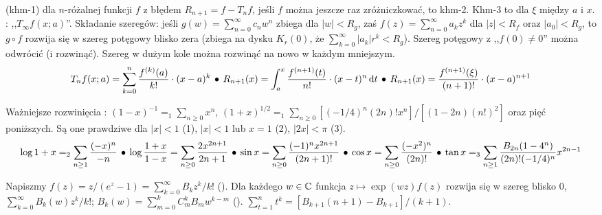  (khm-1)  dla $n$-różalnej funkcji $f$ z błędem $R_{n+1} = f - T_n f$, jeśli $f$ można jeszcze raz zróżniczkować, to khm-2.
Khm-3 to  dla $\xi$ między $a$ i $x$.
: ,,$T_\infty f(x;a)$''.
Składanie szeregów: jeśli $g(w) = \sum_{n=0}^\infty c_nw^n$ zbiega dla $|w| < R_g$, zaś $f(z) = \sum_{n=0}^\infty a_k z^k$ dla $|z| < R_f$ oraz $|a_0| < R_g$, to $g \circ f$ rozwija się w szereg potęgowy blisko zera (zbiega na dysku $K_r(0)$, że $\sum_{k=0}^\infty |a_k| r^k < R_g$).
Szereg potęgowy z ,,$f(0) \neq 0$'' można odwrócić (i rozwinąć). %
Szereg w dużym kole można rozwinąć na nowo w każdym mniejszym. %
\[
	T_nf(x;a) = \sum_{k=0}^n \frac{f^{(k)}(a)}{k!} \cdot (x-a)^k \, \bullet \,
	R_{n+1}(x) = \int_a^x \frac{f^{(n+1)}(t)}{n!} \cdot  (x-t)^n\,\textrm{d}t \, \bullet \,
	R_{n+1}(x) = \frac{f^{(n+1)}(\xi)}{(n+1)!} \cdot (x-a)^{n+1}
\]

Ważniejsze rozwinięcia :
$(1-x)^{-1} =_1 \sum_{n \ge 0} x^n$,
$(1+x)^{1/2} =_1 \sum_{n \ge 0} [(-1/4)^n (2n)! x^n] / [(1-2n)(n!)^2]$ oraz pięć poniższych.
Są one prawdziwe dla $|x| < 1$ (1), $|x| < 1$ lub $x = 1$ (2), $|2x| < \pi$ (3).
\[
	\log 1+x =_2 \sum_{n \ge 1} \frac{(-x)^n}{-n} \, \bullet \,
	\log \frac{1+x}{1-x} = \sum_{n \ge 0} \frac{2x^{2n+1}}{2n+1} \, \bullet \,
	\sin x = \sum_{n \ge 0} \frac{(-1)^n x^{2n+1}}{(2n+1)!} \, \bullet \,
	\cos x = \sum_{n \ge 0} \frac{(-x^2)^n}{(2n)!} \, \bullet \,
	\tan x =_3 \sum_{n \ge 1} \frac{B_{2n} (1-4^n)}{(2n)! (-1/4)^n} x^{2n-1}
\]

Napiszmy  $f(z) = z / (e^z -1) = \sum_{k=0}^\infty B_k z^k/k!$ ().
Dla każdego $w \in \mathbb{C}$ funkcja $z \mapsto \exp(wz) f(z)$ rozwija się w szereg blisko $0$, $\sum_{k=0}^\infty B_k(w) z^k/k!$; $B_k(w) = \sum_{m=0}^k C^k_m B_m w^{k-m}$ ().
\hfill $\sum_{t=1}^n t^k = [B_{k+1}(n+1) - B_{k+1}]/(k+1)$.